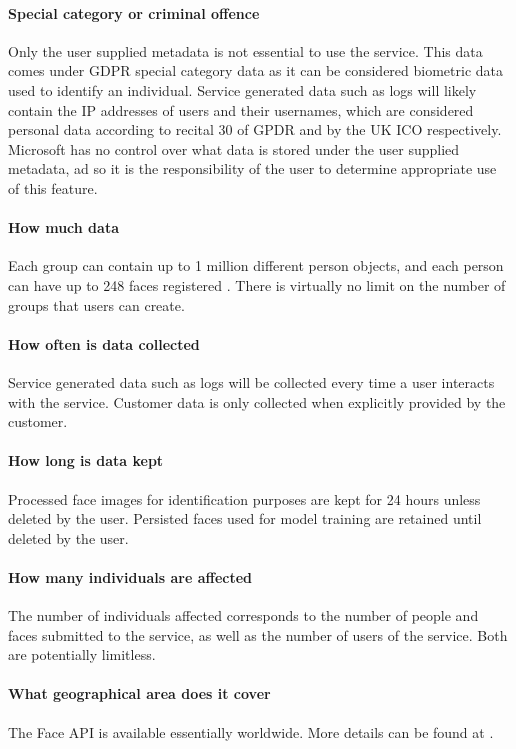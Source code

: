 \documentclass[12pt]{extarticle}
\begin{document}
\paragraph{Special category or criminal offence}
Only the user supplied metadata is not essential to use the service. This data comes under GDPR special category data as it can be considered biometric data used to identify an individual.
Service generated data such as logs will likely contain the IP addresses of users and their usernames, which are considered personal data according to recital 30 of GPDR \cite{vollmer_2018} and by the UK ICO \cite{ico} respectively. 
Microsoft has no control over what data is stored under the user supplied metadata, ad so it is the responsibility of the user to determine appropriate use of this feature.

\paragraph{How much data }
Each group can contain up to 1 million different person objects, and each person can have up to 248 faces registered \cite{faceoverview}. There is virtually no limit on the number of groups that users can create. 

\paragraph{How often is data collected}
Service generated data such as logs will be collected every time a user interacts with the service. 
Customer data is only collected when explicitly provided by the customer.

\paragraph{How long is data kept}
Processed face images for identification purposes are kept for 24 hours unless deleted by the user. Persisted faces used for model training are retained until deleted by the user.

\paragraph{How many individuals are affected}
The number of individuals affected corresponds to the number of people and faces submitted to the service, as well as the number of users of the service. 
Both are potentially limitless.

\paragraph{What geographical area does it cover}
The Face API is available essentially worldwide. More details can be found at \cite{availability}.
\end{document}
